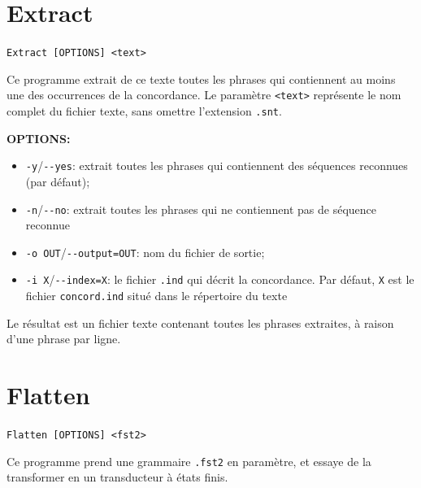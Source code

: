 \section{Extract}
\verb+Extract [OPTIONS] <text>+

\bigskip
\noindent Ce programme extrait de ce texte toutes les phrases qui contiennent au
moins une des occurrences de la concordance. Le paramètre
\verb+<text>+ représente le nom complet du fichier texte, sans omettre l'extension \verb+.snt+.

\bigskip
\noindent \textbf{OPTIONS:}
\begin{itemize}
\item \verb+-y+/\verb+--yes+: extrait toutes les phrases qui contiennent des séquences reconnues
	(par défaut);
\item \verb+-n+/\verb+--no+: extrait toutes les phrases qui ne contiennent pas de séquence reconnue
  \item \verb+-o OUT+/\verb+--output=OUT+: nom du fichier de sortie;
  \item \verb+-i X+/\verb+--index=X+: le fichier \verb+.ind+ qui décrit la concordance. Par défaut, \verb+X+ est le fichier \verb+concord.ind+ situé dans le répertoire du texte
\end{itemize}

\bigskip
\noindent Le résultat est un fichier texte contenant toutes les phrases extraites, à raison
d’une phrase par ligne.








\section{Flatten}
\verb+Flatten [OPTIONS] <fst2>+

\bigskip
\noindent Ce programme prend une grammaire \verb+.fst2+ en paramètre, et essaye de la transformer
en un transducteur à états finis.


